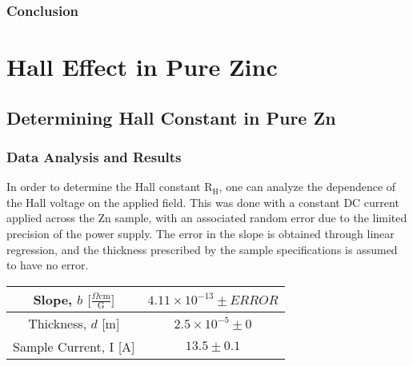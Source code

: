 \documentclass[a4paper]{article}
\begin{document}

\subsubsection{Conclusion}

\section{Hall Effect in Pure Zinc}

\subsection{Determining Hall Constant in Pure Zn}

\subsubsection{Data Analysis and Results}
\qq In order to determine the Hall constant $\text{R}_\text{H}$, one can
analyze the dependence of the Hall voltage on the applied field. This
was done with a constant DC current applied across the Zn sample, with
an associated random error due to the limited precision of the power
supply. The error in the slope is obtained through linear regression,
and the thickness prescribed by the sample specifications is assumed
to have no error.

\begin{center}
\begin{tabular}{|c|c|}
\hline
Slope, $b$ $\big[  \frac{\Omega \text{cm}}{\text{G}} \big] $ & $4.11 \times 10^{-13} \pm ERROR$ \topVspace \bottomVspace \\
\hline
Thickness, $d$ [m] & $2.5 \times 10^{-5} \pm 0$ \topVspace \bottomVspace \\
\hline
Sample Current, I [A] & $13.5 \pm 0.1$ \topVspace \bottomVspace \\
\hline
\end{tabular}
\label{table:zinc_RH}
\end{center}
\end{document}
